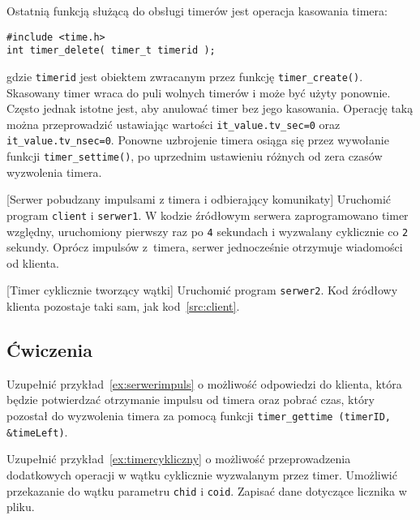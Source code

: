 Ostatnią funkcją służącą do obsługi timerów jest operacja kasowania timera: 

\begin{lstlisting}[style=MyCStyle] 
#include <time.h>
int timer_delete( timer_t timerid );
\end{lstlisting}

gdzie \lstinline[style=MyCStyle]{timerid} jest obiektem zwracanym przez funkcję \lstinline[style=MyCStyle]{timer_create()}.  Skasowany timer wraca do puli wolnych timerów i może być użyty ponownie. Często jednak istotne jest, aby anulować timer bez jego kasowania. Operację taką można przeprowadzić ustawiając wartości \lstinline[style=MyCStyle]{it_value.tv_sec=0} oraz \lstinline[style=MyCStyle]{it_value.tv_nsec=0}. Ponowne uzbrojenie timera osiąga się przez wywołanie funkcji \lstinline[style=MyCStyle]{timer_settime()}, po uprzednim ustawieniu różnych od zera czasów wyzwolenia timera. 


\begin{example}{[Serwer pobudzany impulsami z timera i odbierający komunikaty]} Uruchomić program \lstinline[style=MyCStyle]{client} i \lstinline[style=MyCStyle]{serwer1}. W kodzie źródłowym serwera zaprogramowano timer względny, uruchomiony pierwszy raz po \lstinline[style=MyCStyle]{4} sekundach i wyzwalany cyklicznie co \lstinline[style=MyCStyle]{2} sekundy. Oprócz impulsów z~timera, serwer jednocześnie otrzymuje wiadomości od klienta. 


\label{ex:serwerimpuls}
\end{example} 

\begin{example}{[Timer cyklicznie tworzący wątki]} Uruchomić program \lstinline[style=MyCStyle]{serwer2}. Kod źródłowy klienta pozostaje taki sam, jak kod~\ref{src:client}. 

\label{ex:timercykliczny}
\end{example} 


\subsection{Ćwiczenia}

\begin{myenumerate}
\item Uzupełnić przykład~\ref{ex:serwerimpuls} o możliwość odpowiedzi do klienta, która będzie potwierdzać otrzymanie impulsu od timera oraz pobrać czas, który pozostał do wyzwolenia timera za pomocą funkcji \lstinline[style=MyCStyle]{timer_gettime (timerID, &timeLeft)}.
\item Uzupełnić przykład~\ref{ex:timercykliczny} o możliwość przeprowadzenia dodatkowych operacji w wątku cyklicznie wyzwalanym przez timer. Umożliwić przekazanie do wątku parametru \lstinline[style=MyCStyle]{chid} i \lstinline[style=MyCStyle]{coid}. Zapisać dane dotyczące licznika w pliku. 
\end{myenumerate}

\cleardoublepage
